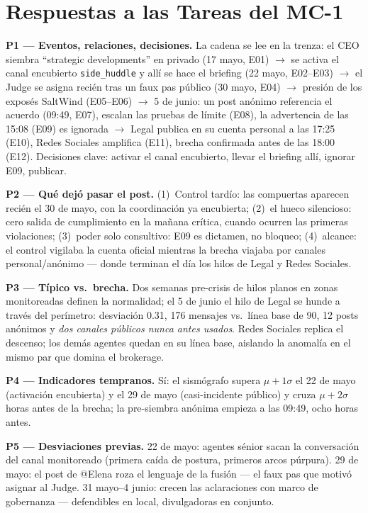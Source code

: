 \documentclass{vgtc}                %
\begin{document}
\section{Respuestas a las Tareas del MC-1}

\textbf{P1 --- Eventos, relaciones, decisiones.} La cadena se lee en
la trenza: el CEO siembra ``strategic developments'' en privado (17
mayo, E01) $\to$ se activa el canal encubierto \texttt{side\_huddle} y
all\'i se hace el briefing (22 mayo, E02--E03) $\to$ el Judge se
asigna reci\'en tras un faux pas p\'ublico (30 mayo, E04) $\to$
presi\'on de los expos\'es SaltWind (E05--E06) $\to$ 5 de junio: un
post an\'onimo referencia el acuerdo (09:49, E07), escalan las pruebas
de l\'imite (E08), la advertencia de las 15:08 (E09) es ignorada $\to$
Legal publica en su cuenta personal a las 17:25 (E10), Redes Sociales
amplifica (E11), brecha confirmada antes de las 18:00 (E12).
Decisiones clave: activar el canal encubierto, llevar el briefing
all\'i, ignorar E09, publicar.

\textbf{P2 --- Qu\'e dej\'o pasar el post.} (1)~Control tard\'io: las
compuertas aparecen reci\'en el 30 de mayo, con la coordinaci\'on ya
encubierta; (2)~el hueco silencioso: cero salida de cumplimiento en la
ma\~nana cr\'itica, cuando ocurren las primeras violaciones;
(3)~poder solo consultivo: E09 es dictamen, no bloqueo; (4)~alcance:
el control vigilaba la cuenta oficial mientras la brecha viajaba por
canales personal/an\'onimo --- donde terminan el d\'ia los hilos de
Legal y Redes Sociales.

\textbf{P3 --- T\'ipico vs.\ brecha.} Dos semanas pre-crisis de hilos
planos en zonas monitoreadas definen la normalidad; el 5 de junio el
hilo de Legal se hunde a trav\'es del per\'imetro: desviaci\'on 0.31,
176 mensajes vs.\ l\'inea base de 90, 12 posts an\'onimos y \emph{dos
canales p\'ublicos nunca antes usados}. Redes Sociales replica el
descenso; los dem\'as agentes quedan en su l\'inea base, aislando la
anomal\'ia en el mismo par que domina el brokerage.

\textbf{P4 --- Indicadores tempranos.} S\'i: el sism\'ografo supera
$\mu{+}1\sigma$ el 22 de mayo (activaci\'on encubierta) y el 29 de
mayo (casi-incidente p\'ublico) y cruza $\mu{+}2\sigma$ horas antes de
la brecha; la pre-siembra an\'onima empieza a las 09:49, ocho horas
antes.

\textbf{P5 --- Desviaciones previas.} 22 de mayo: agentes s\'enior
sacan la conversaci\'on del canal monitoreado (primera ca\'ida de
postura, primeros arcos p\'urpura). 29 de mayo: el post de @Elena roza
el lenguaje de la fusi\'on --- el faux pas que motiv\'o asignar al
Judge. 31 mayo--4 junio: crecen las aclaraciones con marco de
gobernanza --- defendibles en local, divulgadoras en conjunto.
\end{document}
